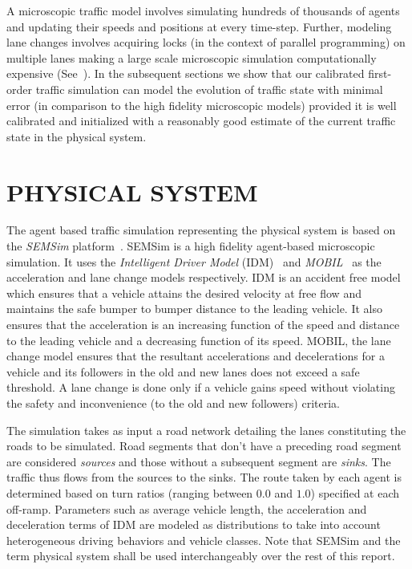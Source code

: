 \documentclass[12pt]{article}
\begin{document}
A microscopic traffic model involves simulating hundreds of thousands of agents and updating their speeds and positions at every time-step. Further, modeling lane changes involves acquiring locks (in the context of parallel programming) on multiple lanes making a large scale microscopic simulation computationally expensive (See~\cite{aydt2013multi}). In the subsequent sections we show that our calibrated first-order traffic simulation can model the evolution of traffic state with minimal error (in comparison to the high fidelity microscopic models) provided it is well calibrated and initialized with a reasonably good estimate of the current traffic state in the physical system.

\section{PHYSICAL SYSTEM}
The agent based traffic simulation representing the physical system is based on the {\it SEMSim} platform~\cite{zehe2015semsim,aydt2013multi}. SEMSim is a high fidelity agent-based microscopic simulation. It uses the {\it Intelligent Driver Model} (IDM)~\cite{treiber2010open} and {\it MOBIL}~\cite{kesting2015general} as the acceleration and lane change models respectively. IDM is an accident free model which ensures that a vehicle attains the desired velocity at free flow and maintains the safe bumper to bumper distance to the leading vehicle. It also ensures that the acceleration is an increasing function of the speed and distance to the leading vehicle and a decreasing function of its speed. MOBIL, the lane change model ensures that the resultant accelerations and decelerations for a vehicle and its followers in the old and new lanes does not exceed a safe threshold. A lane change is done only if a vehicle gains speed without violating the safety and inconvenience (to the old and new followers) criteria.


The simulation takes as input a road network detailing the lanes constituting the roads to be simulated. Road segments that don't have a preceding road segment are considered {\it sources} and those without a subsequent segment are {\it sinks}. The traffic thus flows from the sources to the sinks. The route taken by each agent is determined  based on turn ratios (ranging between $0.0$ and $1.0$) specified at each off-ramp. Parameters such as average vehicle length, the acceleration and deceleration terms of IDM are modeled as distributions to take into account heterogeneous driving behaviors and vehicle classes. Note that SEMSim and the term physical system shall be used interchangeably over the rest of this report.
\end{document}
